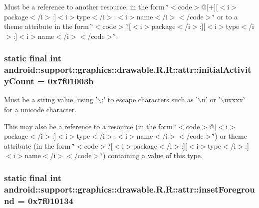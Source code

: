 Must be a reference to another resource, in the form \char`\"{}$<$code$>$@\mbox{[}+\mbox{]}\mbox{[}$<$i$>$package$<$/i$>$:\mbox{]}$<$i$>$type$<$/i$>$:$<$i$>$name$<$/i$>$$<$/code$>$\char`\"{} or to a theme attribute in the form \char`\"{}$<$code$>$?\mbox{[}$<$i$>$package$<$/i$>$:\mbox{]}\mbox{[}$<$i$>$type$<$/i$>$:\mbox{]}$<$i$>$name$<$/i$>$$<$/code$>$\char`\"{}. \hypertarget{classandroid_1_1support_1_1graphics_1_1drawable_1_1_r_1_1attr_4f0270b1d09030ee85afffb0d8b939e1}{
\subsubsection[{initialActivityCount}]{\setlength{\rightskip}{0pt plus 5cm}static final int android::support::graphics::drawable.R.R::attr::initialActivityCount = 0x7f01003b}}
\label{classandroid_1_1support_1_1graphics_1_1drawable_1_1_r_1_1attr_4f0270b1d09030ee85afffb0d8b939e1}


Must be a \hyperlink{classandroid_1_1support_1_1graphics_1_1drawable_1_1_r_1_1string}{string} value, using '$\backslash$;' to escape characters such as '$\backslash$n' or '$\backslash$uxxxx' for a unicode character. 

This may also be a reference to a resource (in the form \char`\"{}$<$code$>$@\mbox{[}$<$i$>$package$<$/i$>$:\mbox{]}$<$i$>$type$<$/i$>$:$<$i$>$name$<$/i$>$$<$/code$>$\char`\"{}) or theme attribute (in the form \char`\"{}$<$code$>$?\mbox{[}$<$i$>$package$<$/i$>$:\mbox{]}\mbox{[}$<$i$>$type$<$/i$>$:\mbox{]}$<$i$>$name$<$/i$>$$<$/code$>$\char`\"{}) containing a value of this type. \hypertarget{classandroid_1_1support_1_1graphics_1_1drawable_1_1_r_1_1attr_d5fa5193bf8163d6cf78ad449d5c86b3}{
\subsubsection[{insetForeground}]{\setlength{\rightskip}{0pt plus 5cm}static final int android::support::graphics::drawable.R.R::attr::insetForeground = 0x7f010134}}
\label{classandroid_1_1support_1_1graphics_1_1drawable_1_1_r_1_1attr_d5fa5193bf8163d6cf78ad449d5c86b3}


